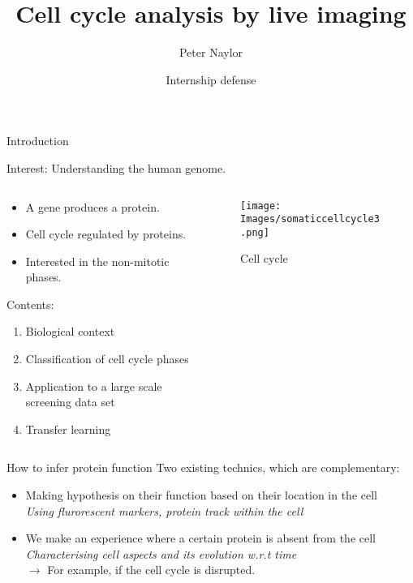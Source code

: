 \documentclass{beamer}
\title{Cell cycle analysis by live imaging}
\author{Peter Naylor}
\date{Internship defense}
\begin{document}
\begin{frame}
  \titlepage
\end{frame}

\begin{frame}{Introduction}

Interest: Understanding the human genome.

\begin{columns}[T] %
\begin{column}{.50\textwidth}

\begin{itemize}
\item A gene produces a protein.
\item Cell cycle regulated by proteins.
\item Interested in the non-mitotic phases.
\end{itemize}

Contents:
\begin{enumerate}
\item Biological context
\item Classification of cell cycle phases
\item Application to a large scale screening data set
\item Transfer learning
\end{enumerate}

\end{column}%

\hfill%
\begin{column}{.30\textwidth}
\begin{figure}[!ht]
\centering
\texttt{[image: Images/somaticcellcycle3.png]}
\caption{Cell cycle}
\label{cellcycle}
\end{figure}
\end{column}%
\end{columns}

\end{frame}





\begin{frame}{How to infer protein function}
Two existing technics, which are complementary:
\begin{itemize}
\item Making hypothesis on their function based on their location in the cell \\ 
\textit{Using flurorescent markers, protein track within the cell} 
\item We make an experience where a certain protein is absent from the cell \\ 
\textit{Characterising cell aspects and its evolution w.r.t time} \\ 
 $\rightarrow$ For example, if the cell cycle is disrupted.
\end{itemize}
\end{frame}
\end{document}
